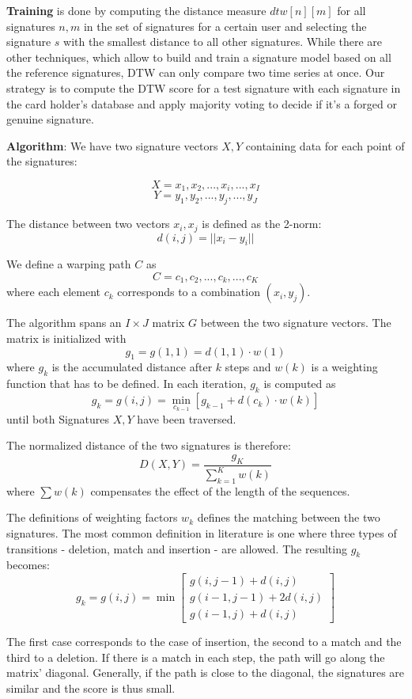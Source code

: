 \documentclass[a4paper, oneside]{csthesis}
\begin{document}
\textbf{Training} is done by computing the distance measure $dtw[n][m]$ for all signatures $n, m$ in the set of signatures for a certain user and selecting the signature $s$ with the smallest distance to all other signatures. While there are other techniques, which allow to build and train a signature model based on all the reference signatures, DTW can only compare two time series at once. Our strategy is to compute the DTW score for a test signature with each signature in the card holder's database and apply majority voting to decide if it's a forged or genuine signature.

\textbf{Algorithm}: We have two signature vectors $X,Y$ containing data for each point of the signatures:

$$X = x_1, x_2, ... , x_i, ... , x_I$$ $$Y = y_1, y_2, ..., y_j, ..., y_J$$

The distance between two vectors $x_i,x_j$ is defined as the 2-norm: $$d(i,j) = ||x_i - y_i||$$

We define a warping path $C$ as $$ C = c_1, c_2, ..., c_k, ..., c_K $$ where each element $c_k$ corresponds to a combination $(x_i, y_j)$.

The algorithm spans an $I \times J$ matrix $G$ between the two signature vectors. The matrix is initialized with $$g_1 = g(1,1) = d(1,1) \cdot w(1)$$ where $g_k$ is the accumulated distance after $k$ steps and $w(k)$ is a weighting function that has to be defined.
In each iteration, $g_k$ is computed as $$g_k = g(i,j) = \min\limits_{c_{k-1}} [g_{k-1}+d(c_k) \cdot w(k)]$$ until both Signatures $X,Y$ have been traversed.

The normalized distance of the two signatures is therefore: $$D(X,Y) = \frac{g_K}{\sum_{k=1}^K w(k)}$$ where $\sum w(k)$ compensates the effect of the length of the sequences.

The definitions of weighting factors $w_k$ defines the matching between the two signatures. The most common definition in literature is one where three types of transitions - deletion, match and insertion - are allowed. The resulting $g_k$ becomes:
$$g_k = g(i,j) = \min \left[\begin{array}{c}g(i,j-1) + d(i,j) \\g(i-1,j-1)+ 2 d(i,j) \\g(i-1,j) + d(i,j)\end{array}\right]$$

The first case corresponds to the case of insertion, the second to a match and the third to a deletion. If there is a match in each step, the path will go along the matrix' diagonal. Generally, if the path is close to the diagonal, the signatures are similar and the score is thus small.
\end{document}
